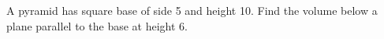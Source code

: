 A pyramid has square base of side 5 and height 10. Find the volume below a plane parallel to the base at height 6.
